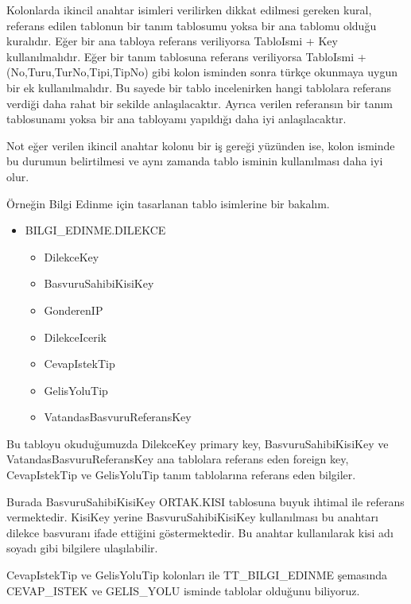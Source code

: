 \documentclass[10pt,a4paper,draft]{article}
\begin{document}
Kolonlarda ikincil anahtar isimleri verilirken dikkat edilmesi gereken kural,
referans edilen tablonun bir tanım tablosumu yoksa bir ana tablomu olduğu kuralıdır.
Eğer bir ana tabloya referans veriliyorsa TabloIsmi + Key kullanılmalıdır.
Eğer bir tanım tablosuna referans veriliyorsa TabloIsmi + (No,Turu,TurNo,Tipi,TipNo)
gibi kolon isminden sonra türkçe okunmaya uygun bir ek kullanılmalıdır.
Bu sayede bir tablo incelenirken hangi tablolara referans verdiği daha rahat bir
sekilde anlaşılacaktır. 
Ayrıca verilen referansın bir tanım tablosunamı yoksa bir ana tabloyamı yapıldığı
daha iyi anlaşılacaktır.

Not eğer verilen ikincil anahtar kolonu bir iş gereği yüzünden ise,
kolon isminde bu durumun belirtilmesi ve aynı zamanda tablo isminin kullanılması daha iyi 
olur.

Örneğin Bilgi Edinme için tasarlanan tablo isimlerine bir bakalım.
\begin{itemize}

\item BILGI\_EDINME.DILEKCE
	\begin{itemize}
		\item DilekceKey
		\item BasvuruSahibiKisiKey
		\item GonderenIP
		\item DilekceIcerik
		\item CevapIstekTip
		\item GelisYoluTip
		\item VatandasBasvuruReferansKey
	\end{itemize}

\end{itemize}

Bu tabloyu okuduğumuzda DilekceKey primary key, 
BasvuruSahibiKisiKey ve VatandasBasvuruReferansKey ana tablolara referans eden foreign key,
CevapIstekTip ve GelisYoluTip tanım tablolarına referans eden bilgiler.

Burada BasvuruSahibiKisiKey ORTAK.KISI tablosuna buyuk ihtimal ile referans vermektedir.
KisiKey yerine BasvuruSahibiKisiKey kullanılması bu anahtarı dilekce basvuranı ifade ettiğini
göstermektedir. Bu anahtar kullanılarak kisi adı soyadı gibi bilgilere ulaşılabilir.

CevapIstekTip ve GelisYoluTip kolonları ile TT\_BILGI\_EDINME şemasında
CEVAP\_ISTEK ve GELIS\_YOLU isminde tablolar olduğunu biliyoruz.
\end{document}
